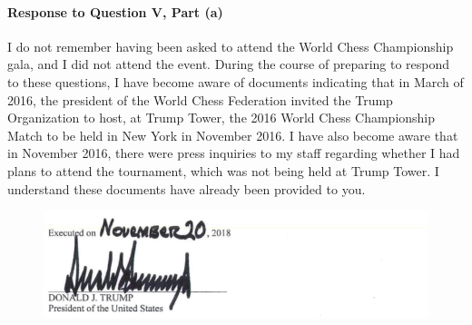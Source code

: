 \paragraph*{Response to Question V, Part (a)}

I do not remember having been asked to attend the World Chess Championship gala, and I did not attend the event.
During the course of preparing to respond to these questions, I have become aware of documents indicating that in March of 2016, the president of the World Chess Federation invited the Trump Organization to host, at Trump Tower, the 2016 World Chess Championship Match to be held in New York in November 2016.
I have also become aware that in November 2016, there were press inquiries to my staff regarding whether I had plans to attend the tournament, which was not being held at Trump Tower.
I understand these documents have already been provided to you.

\begin{figure}[hp]
    \includegraphics[width=6in]{images/appendix-c-signature.png}%
\end{figure}
